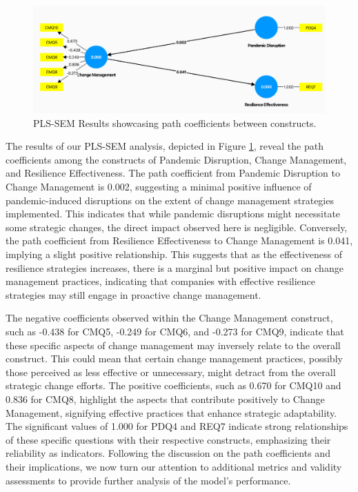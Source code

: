 \begin{figure}[ht]
  \centering
  \includegraphics[width=1\textwidth]{figure/pls_sem_results_cropped.png}
  \caption{PLS-SEM Results showcasing path coefficients between constructs.}
  \label{fig:pls_sem_results}
\end{figure}

The results of our PLS-SEM analysis, depicted in Figure \ref{fig:pls_sem_results}, reveal the path coefficients among the constructs of Pandemic Disruption, Change Management, and Resilience Effectiveness. The path coefficient from Pandemic Disruption to Change Management is 0.002, suggesting a minimal positive influence of pandemic-induced disruptions on the extent of change management strategies implemented. This indicates that while pandemic disruptions might necessitate some strategic changes, the direct impact observed here is negligible. Conversely, the path coefficient from Resilience Effectiveness to Change Management is 0.041, implying a slight positive relationship. This suggests that as the effectiveness of resilience strategies increases, there is a marginal but positive impact on change management practices, indicating that companies with effective resilience strategies may still engage in proactive change management. 

The negative coefficients observed within the Change Management construct, such as -0.438 for CMQ5, -0.249 for CMQ6, and -0.273 for CMQ9, indicate that these specific aspects of change management may inversely relate to the overall construct. This could mean that certain change management practices, possibly those perceived as less effective or unnecessary, might detract from the overall strategic change efforts. The positive coefficients, such as 0.670 for CMQ10 and 0.836 for CMQ8, highlight the aspects that contribute positively to Change Management, signifying effective practices that enhance strategic adaptability. The significant values of 1.000 for PDQ4 and REQ7 indicate strong relationships of these specific questions with their respective constructs, emphasizing their reliability as indicators. Following the discussion on the path coefficients and their implications, we now turn our attention to additional metrics and validity assessments to provide further analysis of the model's performance.

